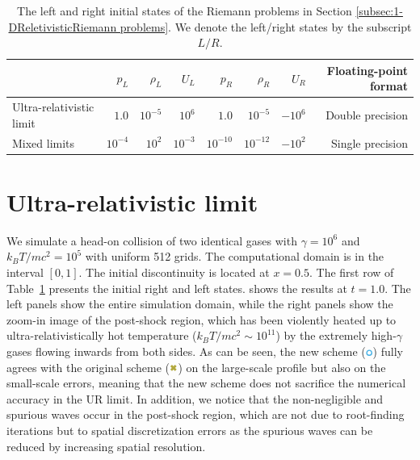 \begin{table}[t]
\caption{The left and right initial states of the Riemann problems in Section \ref{subsec:1-DReletivisticRiemann problems}. We denote the left/right states by the subscript $L/R$.}
\label{tb:IC_RiemannProblems}
\begin{tabular}{@{}lrrrrrrr@{}}
\hline
                         & $p_{L}$   & $\rho_{L}$ & $U_{L}$   & $p_{R}$    & $\rho_{R}$ & $U_{R}$   & Floating-point format \\ \hline
Ultra-relativistic limit & $1.0$     & $10^{-5}$  & $10^6$    & $1.0$      & $10^{-5}$  & $-10^{6}$ & Double precision      \\ \hline
Mixed limits             & $10^{-4}$ & $10^{2}$   & $10^{-3}$ & $10^{-10}$ & $10^{-12}$ & $-10^{2}$  & Single precision      \\ \hline
\end{tabular}
\end{table}


\section{Ultra-relativistic limit}
\label{subsubsec:Ultra-relativistic limit}
We simulate a head-on collision of two identical gases with $\gamma=10^{6}$ and $k_{B}T/mc^2=10^5$ with uniform 512 grids. The computational domain is in the interval $[0,1]$. The initial discontinuity is located at $x=0.5$. The first row of Table~\ref{tb:IC_RiemannProblems} presents the initial right and left states.  shows the results at $t=1.0$. The left panels show the entire simulation domain, while the right panels show the zoom-in image of the post-shock region, which has been violently heated up to ultra-relativistically hot temperature ($k_{B}T/mc^2 \sim 10^{11}$) by the extremely high-$\gamma$ gases flowing inwards from both sides. As can be seen, the new scheme ($\tikz\draw[HeadOnCollisionNew,fill=white,line width=1] (0,0) circle (.5ex);$) fully agrees with the original scheme ($\MyCross[draw=HeadOnCollisionOri,fill=HeadOnCollisionOri]$) on the large-scale profile but also on the small-scale errors, meaning that the new scheme does not sacrifice the numerical accuracy in the UR limit. In addition, we notice that the non-negligible and spurious waves occur in the post-shock region, which are not due to root-finding iterations but to spatial discretization errors as the spurious waves can be reduced by increasing spatial resolution.


